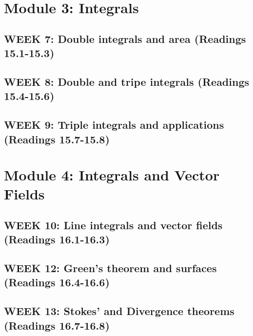 \documentclass[12pt]{article}
\begin{document}
\pagebreak
\section{Module 3: Integrals}
\subsection{WEEK 7: Double integrals and area (Readings 15.1-15.3)}

\subsection{WEEK 8: Double and tripe integrals (Readings 15.4-15.6)}

\subsection{WEEK 9: Triple integrals and applications (Readings 15.7-15.8)}

\pagebreak
\section{Module 4: Integrals and Vector Fields}
\subsection{WEEK 10: Line integrals and vector fields (Readings 16.1-16.3)}

\subsection{WEEK 12: Green's theorem and surfaces (Readings 16.4-16.6)}

\subsection{WEEK 13: Stokes' and Divergence theorems (Readings 16.7-16.8)}
\end{document}
